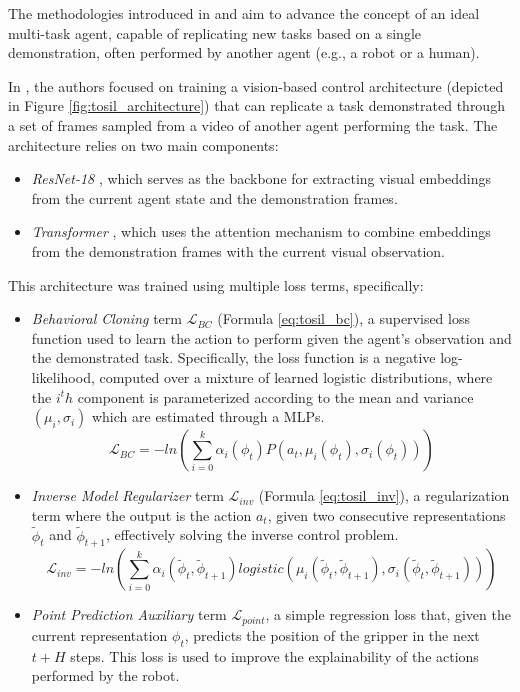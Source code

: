 The methodologies introduced in \cite{dasari2021transformers_one_shot} and \cite{mandi2022towards_more_generalizable_one_shot} aim to advance the concept of an ideal multi-task agent, capable of replicating new tasks based on a single demonstration, often performed by another agent (e.g., a robot or a human).

In \cite{dasari2021transformers_one_shot}, the authors focused on training a vision-based control architecture (depicted in Figure \ref{fig:tosil_architecture}) that can replicate a task demonstrated through a set of frames sampled from a video of another agent performing the task. The architecture relies on two main components:
\begin{itemize}
    \item \textit{ResNet-18} \cite{resnet}, which serves as the backbone for extracting visual embeddings from the current agent state and the demonstration frames.
    \item \textit{Transformer} \cite{vaswani2017attention}, which uses the attention mechanism to combine embeddings from the demonstration frames with the current visual observation.
\end{itemize}

This architecture was trained using multiple loss terms, specifically:
\begin{itemize}
    \item \textit{Behavioral Cloning} term $\mathcal{L}_{BC}$ (Formula \ref{eq:tosil_bc}), a supervised loss function used to learn the action to perform given the agent's observation and the demonstrated task. Specifically, the loss function is a negative log-likelihood, computed over a mixture of learned logistic distributions, where the $i^th$ component is parameterized according to the mean and variance $(\mu_{i}, \sigma_{i})$ which are estimated through a MLPs.
    \begin{equation}
        \label{eq:tosil_bc}
        \mathcal{L}_{BC} = - ln(\sum_{i=0}^{k}\alpha_{i}(\phi_{t}) P(a_{t}, \mu_{i}(\phi_{t}), \sigma_{i}(\phi_{t})))
    \end{equation}
    \item \textit{Inverse Model Regularizer} term $\mathcal{L}_{inv}$ (Formula \ref{eq:tosil_inv}), a regularization term where the output is the action $a_{t}$, given two consecutive representations $\tilde{\phi}_{t}$ and $\tilde{\phi}_{t+1}$, effectively solving the inverse control problem.
    \begin{equation}
        \label{eq:tosil_inv}
        \mathcal{L}_{inv} = - ln(\sum_{i=0}^{k}\alpha_{i}(\tilde{\phi}_{t}, \tilde{\phi}_{t+1}) logistic(\mu_{i}(\tilde{\phi}_{t}, \tilde{\phi}_{t+1}), \sigma_{i}(\tilde{\phi}_{t}, \tilde{\phi}_{t+1})))
    \end{equation}
    \item \textit{Point Prediction Auxiliary} term $\mathcal{L}_{point}$, a simple regression loss that, given the current representation $\phi_{t}$, predicts the position of the gripper in the next $t+H$ steps. This loss is used to improve the explainability of the actions performed by the robot.
\end{itemize}

